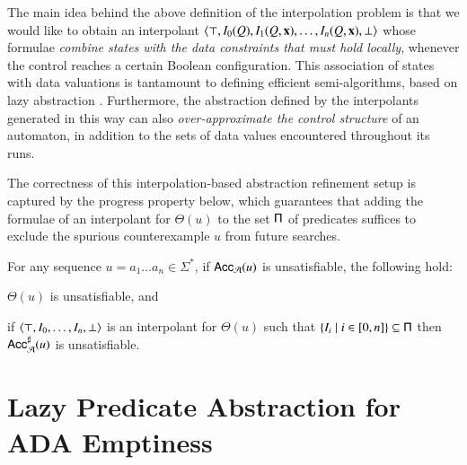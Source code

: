 \documentclass[10pt]{llncs}
\begin{document}
The main idea behind the above definition of the interpolation problem
is that we would like to obtain an interpolant $\left\langle \top,I_0(Q),
  I_1(Q,\mathbf x), \ldots, I_{n}(Q,\mathbf x),\bot \right\rangle$ whose formulae
\emph{combine states with the data constraints that must hold
  locally}, whenever the control reaches a certain Boolean
configuration. This association of states with data valuations is
tantamount to defining efficient semi-algorithms, based on lazy
abstraction \cite{HJMS02}. Furthermore, the abstraction defined by the
interpolants generated in this way can also \emph{over-approximate the
  control structure} of an automaton, in addition to the sets of data
values encountered throughout its runs.

The correctness of this interpolation-based abstraction refinement
setup is captured by the progress property below, which guarantees
that adding the formulae of an interpolant for $\Theta(u)$ to the set
$\mathsf{\Pi}$ of predicates suffices to exclude the spurious counterexample
$u$ from future searches.

\begin{lemma}\label{lemma:progress}
  For any sequence $u = a_1\ldots a_n \in \Sigma^*$, if
  $\mathsf{Acc}_{\mathcal{A}}(u)$ is unsatisfiable, the following
  hold: \begin{compactenum}
  \item\label{it1:progress} $\Theta(u)$ is unsatisfiable, and
  \item\label{it2:progress} if $\left\langle \top,I_0,\dots,I_{n},\bot \right\rangle$ is
    an interpolant for $\Theta(u)$ such that $\left\{ I_i \mid i
      \in[0,n] \right\} \subseteq \mathsf{\Pi}$ then ${\mathsf{Acc}}^\sharp_{\mathcal{A}}(u)$ is
    unsatisfiable.
  \end{compactenum}
\end{lemma}

\section{Lazy Predicate Abstraction for ADA Emptiness}
\end{document}
